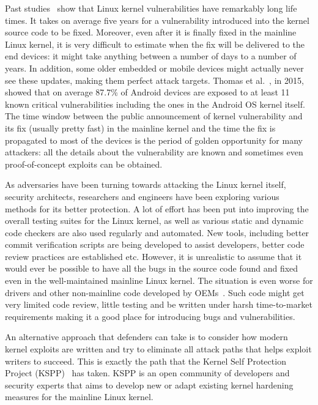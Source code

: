 Past studies~\cite{stoep2016android, cooklss2016} show that Linux kernel vulnerabilities have remarkably long life times. It takes on average five years for a vulnerability introduced into the kernel source code to be fixed. Moreover, even after it is finally fixed in the mainline Linux kernel, it is very difficult to estimate when the fix will be delivered to the end devices: it might take anything between a number of days to a number of years. In addition, some older embedded or mobile devices might actually never see these updates, making them perfect attack targets. Thomas et al.~\cite{Thomas2015}, in 2015, showed that on average 87.7\% of Android devices are exposed to at least 11 known critical vulnerabilities including the ones in the Android OS kernel itself. The time window between the public announcement of kernel vulnerability and its fix (usually pretty fast) in the mainline kernel and the time the fix is propagated to most of the devices is the period of golden opportunity for many attackers: all the details about the vulnerability are known and sometimes even proof-of-concept exploits can be obtained.

As adversaries have been turning towards attacking the Linux kernel itself, security architects, researchers and engineers have been exploring various methods for its better protection. A lot of effort has been put into improving the overall testing suites for the Linux kernel, as well as various static and dynamic code checkers are also used regularly and automated. New tools, including better commit verification scripts are being developed to assist developers, better code review practices are established etc. However, it is unrealistic to assume that it would ever be possible to have all the bugs in the source code found and fixed even in the well-maintained mainline Linux kernel. The situation is even worse for drivers and other non-mainline code developed by OEMs~\cite{stoep2016android}. Such code might get very limited code review, little testing and be written under harsh time-to-market requirements making it a good place for introducing bugs and vulnerabilities.

An alternative approach that defenders can take is to consider how modern kernel exploits are written and try to eliminate all attack paths that helps exploit writers to succeed. This is exactly the path that the Kernel Self Protection Project (KSPP)~\cite{kspp} has taken. KSPP is an open community of developers and security experts that aims to develop new or adapt existing kernel hardening measures for the mainline Linux kernel. 

